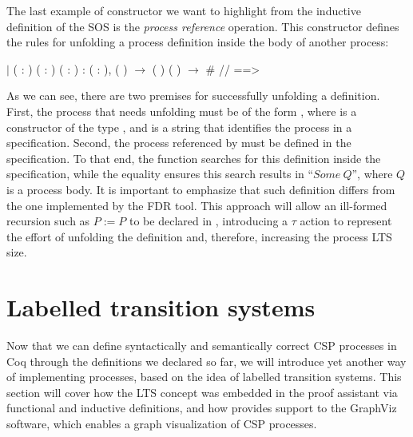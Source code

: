 The last example of constructor we want to highlight from the inductive definition of the SOS is the \emph{process reference} operation. This constructor defines the rules for unfolding a process definition inside the body of another process:

\begin{coqdoccode}
	\coqdocnoindent
	\ensuremath{|}  ( : ) ( : ) ( : ) :\coqdoceol
	\coqdocindent{1.00em}
	\coqdockw{\ensuremath{\forall}} ( : ),\coqdoceol
	\coqdocindent{3.00em}
	  ( ) \ensuremath{\rightarrow}\coqdoceol
	\coqdocindent{3.00em}
	 (  ) ( ) \ensuremath{\rightarrow}\coqdoceol
	\coqdocindent{3.00em}
	 \#  //  ==> \coqdoceol
\end{coqdoccode}

As we can see, there are two premises for successfully unfolding a definition. First, the process that needs unfolding must be of the form  , where  is a constructor of the type , and  is a string that identifies the process in a specification. Second, the process referenced by   must be defined in the specification. To that end, the function  searches for this definition inside the specification, while the equality ensures this search results in ``$ Some \ Q $'', where $ Q $ is a process body. It is important to emphasize that such definition differs from the one implemented by the FDR tool. This approach will allow an ill-formed recursion such as $ P := P $ to be declared in \CSPcoq{}, introducing a $ \tau $ action to represent the effort of unfolding the definition and, therefore, increasing the process LTS size.

\section{Labelled transition systems}
\label{section:lts}

Now that we can define syntactically and semantically correct CSP processes in Coq through the definitions we declared so far, we will introduce yet another way of implementing processes, based on the idea of labelled transition systems. This section will cover how the LTS concept was embedded in the proof assistant via functional and inductive definitions, and how \CSPcoq{} provides support to the GraphViz software, which enables a graph visualization of CSP processes.

